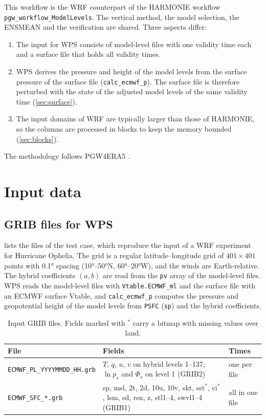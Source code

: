 \documentclass[11pt,a4paper]{article}
\newcommand{\code}[1]{\texttt{#1}}
\begin{document}
This workflow is the WRF counterpart of the HARMONIE workflow
\code{pgw\_workflow\_ModelLevels}. The vertical method, the model selection,
the ENSMEAN and the verification are shared. Three aspects differ:
\begin{enumerate}
  \item The input for WPS consists of model-level files with one validity time
    each and a surface file that holds all validity times.
  \item WPS derives the pressure and height of the model levels from the
    surface pressure of the surface file (\code{calc\_ecmwf\_p}). The surface
    file is therefore perturbed with the state of the adjusted model levels of
    the same validity time (\cref{sec:surface}).
  \item The input domains of WRF are typically larger than those of HARMONIE,
    so the columns are processed in blocks to keep the memory bounded
    (\cref{sec:blocks}).
\end{enumerate}
The methodology follows PGW4ERA5 \citep{Brogli2023}.

\section{Input data}
\label{sec:data}

\subsection{GRIB files for WPS}

 lists the files of the test case, which reproduce the input
of a WRF experiment for Hurricane Ophelia. The grid is a regular
latitude--longitude grid of $401\times401$ points with \ang{0.1} spacing
(\ang{10}--\ang{50}N, \ang{60}--\ang{20}W), and the winds are
Earth-relative. The hybrid coefficients $(a, b)$ are read from the \code{pv}
array of the model-level files. WPS reads the model-level files with
\code{Vtable.ECMWF\_ml} and the surface file with an ECMWF surface Vtable,
and \code{calc\_ecmwf\_p} computes the pressure and geopotential height of
the model levels from \code{PSFC} (\code{sp}) and the hybrid coefficients.

\begin{table}[htbp]
\centering
\caption{Input GRIB files. Fields marked with $^{*}$ carry a bitmap with
missing values over land.}
\label{tab:files}
\small
\begin{tabularx}{\linewidth}{>{\raggedright\arraybackslash}p{4.6cm}Xl}
\toprule
File & Fields & Times \\
\midrule
\code{ECMWF\_PL\_YYYYMMDD\_HH.grb} & $T$, $q$, $u$, $v$ on hybrid levels 1--137;
  $\ln p_s$ and $\Phi_s$ on level 1 (GRIB2) & one per file \\
\code{ECMWF\_SFC\_*.grb} & sp, msl, 2t, 2d, 10u, 10v, skt, sst$^{*}$, ci$^{*}$,
  lsm, sd, rsn, z, stl1--4, swvl1--4 (GRIB1) & all in one file \\
\bottomrule
\end{tabularx}
\end{table}
\end{document}
